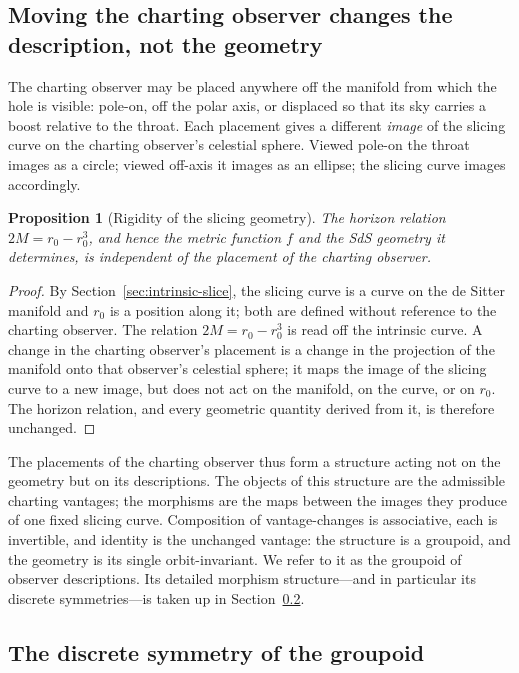 \documentclass[11pt,a4paper]{article}
\newtheorem{proposition}[theorem]{Proposition}
\theoremstyle{definition}
\begin{document}
\subsection{Moving the charting observer changes the description, not the geometry}

The charting observer may be placed anywhere off the manifold from which the hole is visible: pole-on, off the polar axis, or displaced so that its sky carries a boost relative to the throat. Each placement gives a different \emph{image} of the slicing curve on the charting observer's celestial sphere. Viewed pole-on the throat images as a circle; viewed off-axis it images as an ellipse; the slicing curve images accordingly.

\begin{proposition}[Rigidity of the slicing geometry]\label{prop:rigidity}
The horizon relation $2M=r_{0}-r_{0}^{3}$, and hence the metric function $f$ and the SdS geometry it determines, is independent of the placement of the charting observer.
\end{proposition}

\begin{proof}
By Section~\ref{sec:intrinsic-slice}, the slicing curve is a curve on the de Sitter manifold and $r_{0}$ is a position along it; both are defined without reference to the charting observer. The relation $2M=r_{0}-r_{0}^{3}$ is read off the intrinsic curve. A change in the charting observer's placement is a change in the projection of the manifold onto that observer's celestial sphere; it maps the image of the slicing curve to a new image, but does not act on the manifold, on the curve, or on $r_{0}$. The horizon relation, and every geometric quantity derived from it, is therefore unchanged.
\end{proof}

The placements of the charting observer thus form a structure acting not on the geometry but on its descriptions. The objects of this structure are the admissible charting vantages; the morphisms are the maps between the images they produce of one fixed slicing curve. Composition of vantage-changes is associative, each is invertible, and identity is the unchanged vantage: the structure is a groupoid, and the geometry is its single orbit-invariant. We refer to it as the groupoid of observer descriptions. Its detailed morphism structure---and in particular its discrete symmetries---is taken up in Section~\ref{sec:groupoid-symmetry}.

\subsection{The discrete symmetry of the groupoid}\label{sec:groupoid-symmetry}
\end{document}
